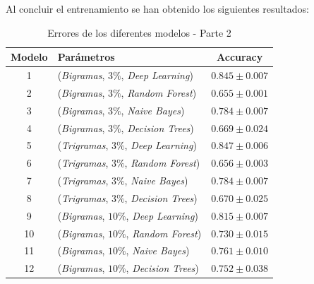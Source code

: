 \documentclass[es]{uc3mreport}
\begin{document}
\begin{report}
    Al concluir el entrenamiento se han obtenido los siguientes resultados:

    \begin{table}[H]
        \begin{center}
            \begin{tabular}{ @{}clc@{} }
                \toprule
                Modelo & Parámetros\footnotemark[2] & Accuracy\\
                \midrule
                1  & (\textit{Bigramas},  $3\%$, \textit{Deep Learning})  & $0.845 \pm 0.007$ \\
                2  & (\textit{Bigramas},  $3\%$, \textit{Random Forest})  & $0.655 \pm 0.001$ \\
                3  & (\textit{Bigramas},  $3\%$, \textit{Naive Bayes})    & $0.784 \pm 0.007$ \\
                4  & (\textit{Bigramas},  $3\%$, \textit{Decision Trees}) & $0.669 \pm 0.024$ \\
                5  & (\textit{Trigramas}, $3\%$, \textit{Deep Learning})  & $0.847 \pm 0.006$ \\
                6  & (\textit{Trigramas}, $3\%$, \textit{Random Forest})  & $0.656 \pm 0.003$ \\
                7  & (\textit{Trigramas}, $3\%$, \textit{Naive Bayes})    & $0.784 \pm 0.007$ \\
                8  & (\textit{Trigramas}, $3\%$, \textit{Decision Trees}) & $0.670 \pm 0.025$ \\
                9  & (\textit{Bigramas}, $10\%$, \textit{Deep Learning})  & $0.815 \pm 0.007$ \\
                10 & (\textit{Bigramas}, $10\%$, \textit{Random Forest})  & $0.730 \pm 0.015$ \\
                11 & (\textit{Bigramas}, $10\%$, \textit{Naive Bayes})    & $0.761 \pm 0.010$ \\
                12 & (\textit{Bigramas}, $10\%$, \textit{Decision Trees}) & $0.752 \pm 0.038$ \\
                \bottomrule
            \end{tabular}
            \caption{Errores de los diferentes modelos - Parte 2}
        \end{center}
    \end{table}


\end{report}
\end{document}
